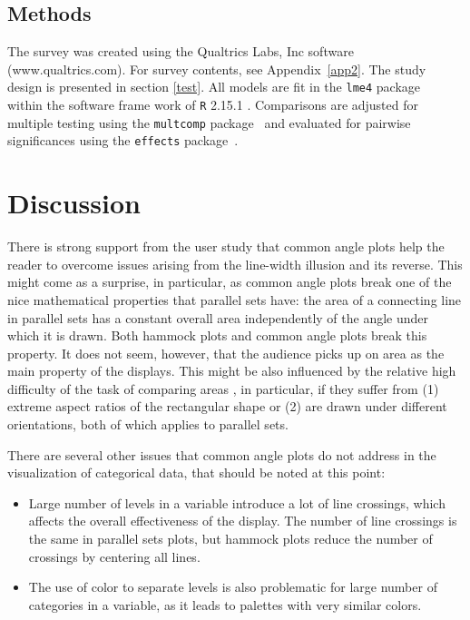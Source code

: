 \documentclass[journal]{vgtc}\usepackage{graphicx, color}
\begin{document}
\subsection{Methods}

The survey was created using the Qualtrics Labs, Inc software (www.qualtrics.com). For survey contents, see Appendix~\ref{app2}. The study design is presented in section \ref{test}. All models are fit in the {\tt lme4} package~\cite{lmer} within the software frame work of {\tt R} 2.15.1 \cite{R}. Comparisons are adjusted for multiple testing using the {\tt multcomp} package~\cite{multcomp} and evaluated for pairwise significances using the {\tt effects} package~\cite{effects}.


\section{Discussion}
There is strong support from the user study that common angle plots help the reader to overcome issues arising from the line-width illusion and its reverse. This might come as a surprise, in particular, as common angle plots break one of the nice mathematical properties that parallel sets have:
the area of a connecting line in parallel sets has a constant  overall area  independently of the angle under which it is drawn. Both hammock plots and common angle plots break this property. It does not seem, however, that the audience picks up on area as the main property of the displays. This might be also influenced by the relative high difficulty of the task of comparing areas \cite{heer:2010, kong:2010}, in particular, if they suffer from  (1) extreme aspect ratios of the rectangular shape or (2) are drawn under different orientations, both of which applies to parallel sets. 

There are several other issues that common angle plots do not address in the visualization of categorical data, that should be noted at this point: \begin{itemize}
\item Large number of levels in a variable introduce a lot of line crossings, which affects the overall effectiveness of the display. The number of line crossings is the same in parallel sets plots, but hammock plots reduce the number of crossings by centering all lines.
\item The use of color to separate levels is also problematic for large number of categories in a variable, as it leads to  palettes with very similar colors.
\end{itemize}
\end{document}
